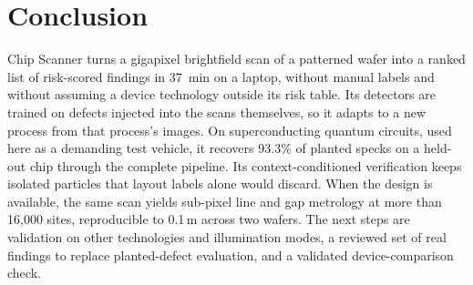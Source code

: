 \documentclass[journal]{IEEEtran}
\newcommand{\um}{\,\textmu m}
\begin{document}
\section{Conclusion}\label{sec:conclusion}
Chip Scanner turns a gigapixel brightfield scan of a patterned wafer into a ranked list of risk-scored findings in 37~min on a laptop, without manual labels and without assuming a device technology outside its risk table. Its detectors are trained on defects injected into the scans themselves, so it adapts to a new process from that process's images. On superconducting quantum circuits, used here as a demanding test vehicle, it recovers 93.3\% of planted specks on a held-out chip through the complete pipeline. Its context-conditioned verification keeps isolated particles that layout labels alone would discard. When the design is available, the same scan yields sub-pixel line and gap metrology at more than 16{,}000 sites, reproducible to 0.1\um{} across two wafers. The next steps are validation on other technologies and illumination modes, a reviewed set of real findings to replace planted-defect evaluation, and a validated device-comparison check.



\end{document}
